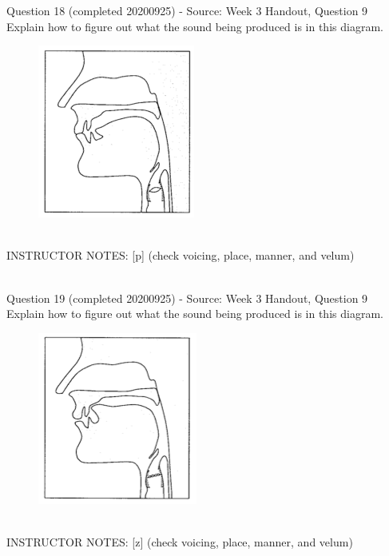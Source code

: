 \documentclass[12pt]{article}
\begin{document}
{\large Question 18} (completed 20200925) - Source: Week 3 Handout, Question 9\\

Explain how to figure out what the sound being produced is in this diagram.\\

\begin{figure}[H]
\includegraphics{../images/sagittal_p.png}
\end{figure}

~\\
INSTRUCTOR NOTES: [p] (check voicing, place, manner, and velum)


~\\

{\large Question 19} (completed 20200925) - Source: Week 3 Handout, Question 9\\

Explain how to figure out what the sound being produced is in this diagram.\\

\begin{figure}[H]
\includegraphics{../images/sagittal_z.png}
\end{figure}

~\\
INSTRUCTOR NOTES: [z] (check voicing, place, manner, and velum)


~\\
\end{document}
